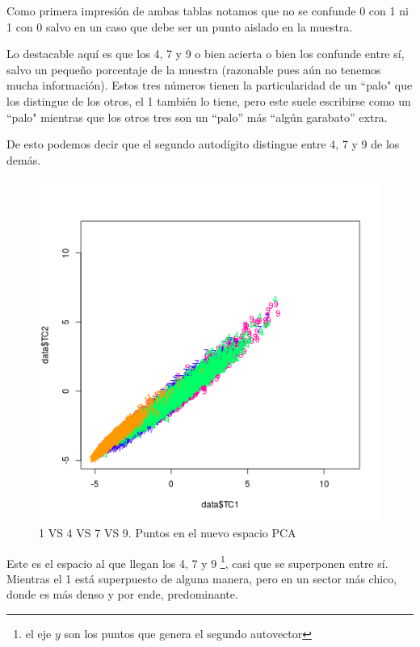 Como primera impresi\'on de ambas tablas notamos que no se confunde 0 con 1 ni 1 con 0 salvo en un caso que debe ser un punto aislado en la muestra.

Lo destacable aqu\'i es que los 4, 7 y 9 o bien acierta o bien los confunde entre s\'i, salvo un peque\~no porcentaje de la muestra (razonable pues a\'un no tenemos mucha informaci\'on). Estos tres n\'umeros tienen la particularidad de un ``palo" que los distingue de los otros, el 1 tambi\'en lo tiene, pero este suele escribirse como un ``palo" mientras que los otros tres son un ``palo'' m\'as ``alg\'un garabato'' extra.

De esto podemos decir que el segundo autod\'igito distingue entre 4, 7 y 9 de los dem\'as.

\newpage

\begin{figure}[h!]
  \begin{center}
	\includegraphics[scale=0.8]{exp5/PCA-2-1vs4vs7vs9}
	\caption{1 VS 4 VS 7 VS 9. Puntos en el nuevo espacio PCA}
  \end{center}
\end{figure}

Este es el espacio al que llegan los 4, 7 y 9 \footnote{el eje $y$ son los puntos que genera el segundo autovector}, casi que se superponen entre s\'i. Mientras el 1 est\'a superpuesto de alguna manera, pero en un sector m\'as chico, donde es m\'as denso y por ende, predominante.

